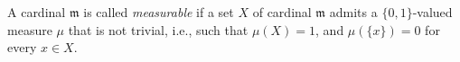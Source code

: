 A cardinal $\mathfrak{m}$ is called \emph{measurable} if a set $X$ of cardinal $\mathfrak{m}$ admits a $\{0,1\}$-valued measure $\mu$ that is not trivial, i.e., such that $\mu(X) = 1$, and $\mu(\{x\}) = 0$ for every $x \in X$.